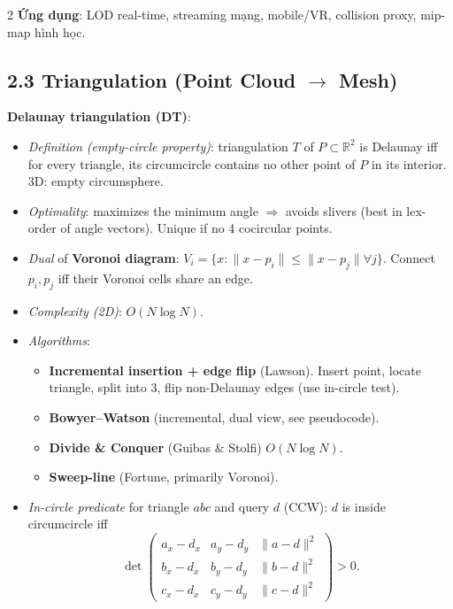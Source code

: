 \begin{paracol}{2}
\textbf{Ứng dụng}: LOD real-time, streaming mạng, mobile/VR, collision proxy, mip-map hình học.

\switchcolumn*

\subsection*{2.3 Triangulation (Point Cloud $\to$ Mesh)}

\textbf{Delaunay triangulation (DT)}:
\begin{itemize}[leftmargin=*,nosep]
  \item \emph{Definition (empty-circle property)}: triangulation $T$ of $P\subset\mathbb{R}^2$ is Delaunay iff for every triangle, its circumcircle contains no other point of $P$ in its interior. 3D: empty circumsphere.
  \item \emph{Optimality}: maximizes the minimum angle $\Rightarrow$ avoids slivers (best in lex-order of angle vectors). Unique if no 4 cocircular points.
  \item \emph{Dual} of \textbf{Voronoi diagram}: $V_i=\{x:\|x-p_i\|\le\|x-p_j\|\forall j\}$. Connect $p_i,p_j$ iff their Voronoi cells share an edge.
  \item \emph{Complexity (2D)}: $O(N\log N)$.
  \item \emph{Algorithms}:
    \begin{itemize}[leftmargin=1em,nosep]
      \item \textbf{Incremental insertion + edge flip} (Lawson). Insert point, locate triangle, split into 3, flip non-Delaunay edges (use in-circle test).
      \item \textbf{Bowyer–Watson} (incremental, dual view, see pseudocode).
      \item \textbf{Divide \& Conquer} (Guibas \& Stolfi) $O(N\log N)$.
      \item \textbf{Sweep-line} (Fortune, primarily Voronoi).
    \end{itemize}
  \item \emph{In-circle predicate} for triangle $abc$ and query $d$ (CCW): $d$ is inside circumcircle iff
  \[\det\!\begin{pmatrix}a_x{-}d_x & a_y{-}d_y & \|a{-}d\|^2\\ b_x{-}d_x & b_y{-}d_y & \|b{-}d\|^2\\ c_x{-}d_x & c_y{-}d_y & \|c{-}d\|^2\end{pmatrix}>0.\]
\end{itemize}


\end{paracol}
